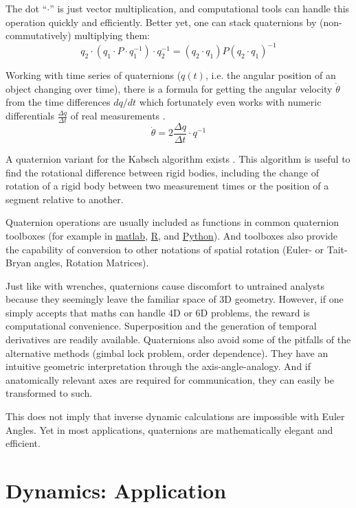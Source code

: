 \documentclass[10pt,a4paper]{article}
\begin{document}
The dot ``\(\cdot\)'' is just vector multiplication, and computational tools can handle this operation quickly and efficiently.
Better yet, one can stack quaternions by (non-commutatively) multiplying them:
\[ q_2 \cdot \left( q_1\cdot P\cdot q_1^{-1}\right) \cdot q_2^{-1} = (q_2\cdot q_1) P (q_2\cdot q_1)^{-1} \]

Working with time series of quaternions (\(q(t)\), i.e. the angular position of an object changing over time), there is a formula for getting the angular velocity \(\dot \theta\) from the time differences \(dq/dt\) which fortunately even works with numeric differentials \(\frac{\Delta q}{\Delta t}\) of real measurements \citep{Baker1999}.
\[\dot \theta = 2 \frac{\Delta q}{\Delta t} \cdot q^{-1} \]

A quaternion variant for the Kabsch algorithm exists \citep{Kabsch1976,Lawrence2019,Kneller1991}.
This algorithm is useful to find the rotational difference between rigid bodies, including the change of rotation of a rigid body between two measurement times or the position of a segment relative to another.


Quaternion operations are usually included as functions in common quaternion toolboxes (for example in \href{https://www.mathworks.com/discovery/quaternion.html}{matlab}, \href{https://cran.r-project.org/web/packages/onion/onion.pdf}{R}, and \href{https://pypi.org/project/numpy-quaternion}{Python}).
And toolboxes also provide the capability of conversion to other notations of spatial rotation (Euler- or Tait-Bryan angles, Rotation Matrices).


Just like with wrenches, quaternions cause discomfort to untrained analysts because they seemingly leave the familiar space of 3D geometry.
However, if one simply accepts that maths can handle 4D or 6D problems, the reward is computational convenience.
Superposition and the generation of temporal derivatives are readily available.
Quaternions also avoid some of the pitfalls of the alternative methods (gimbal lock problem, order dependence).
They have an intuitive geometric interpretation through the axis-angle-analogy.
And if anatomically relevant axes are required for communication, they can easily be transformed to such.

This does not imply that inverse dynamic calculations are impossible with Euler Angles.
Yet in most applications, quaternions are mathematically elegant and efficient.


\section{Dynamics: Application}
\label{sec:orga135cec}
\end{document}
